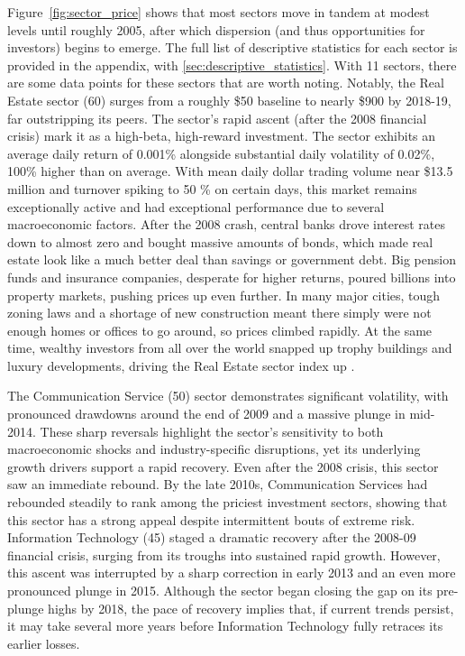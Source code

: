 Figure~\ref{fig:sector_price} shows that most sectors move in tandem at modest levels until roughly 2005, after which dispersion (and thus opportunities for investors) begins to emerge. The full list of descriptive statistics for each sector is provided in the appendix, with \cref{sec:descriptive_statistics}. With 11 sectors, there are some data points for these sectors that are worth noting. Notably, the Real Estate sector (60) surges from a roughly \$50 baseline to nearly \$900 by 2018-19, far outstripping its peers. The sector's rapid ascent (after the 2008 financial crisis) mark it as a high-beta, high-reward investment. The sector exhibits an average daily return of 0.001\% alongside substantial daily volatility of 0.02\%, 100\% higher than on average. With mean daily dollar trading volume near \$13.5 million and turnover spiking to 50 \% on certain days, this market remains exceptionally active and had exceptional performance due to several macroeconomic factors. After the 2008 crash, central banks drove interest rates down to almost zero and bought massive amounts of bonds, which made real estate look like a much better deal than savings or government debt. Big pension funds and insurance companies, desperate for higher returns, poured billions into property markets, pushing prices up even further. In many major cities, tough zoning laws and a shortage of new construction meant there simply were not enough homes or offices to go around, so prices climbed rapidly. At the same time, wealthy investors from all over the world snapped up trophy buildings and luxury developments, driving the Real Estate sector index up \cite{cbre_2018}. %

The Communication Service (50) sector demonstrates significant volatility, with pronounced drawdowns around the end of 2009 and a massive plunge in mid-2014. These sharp reversals highlight the sector's sensitivity to both macroeconomic shocks and industry-specific disruptions, yet its underlying growth drivers support a rapid recovery. Even after the 2008 crisis, this sector saw an immediate rebound. By the late 2010s, Communication Services had rebounded steadily to rank among the priciest investment sectors, showing that this sector has a strong appeal despite intermittent bouts of extreme risk. Information Technology (45) staged a dramatic recovery after the 2008-09 financial crisis, surging from its troughs into sustained rapid growth. However, this ascent was interrupted by a sharp correction in early 2013 and an even more pronounced plunge in 2015. Although the sector began closing the gap on its pre-plunge highs by 2018, the pace of recovery implies that, if current trends persist, it may take several more years before Information Technology fully retraces its earlier losses.

